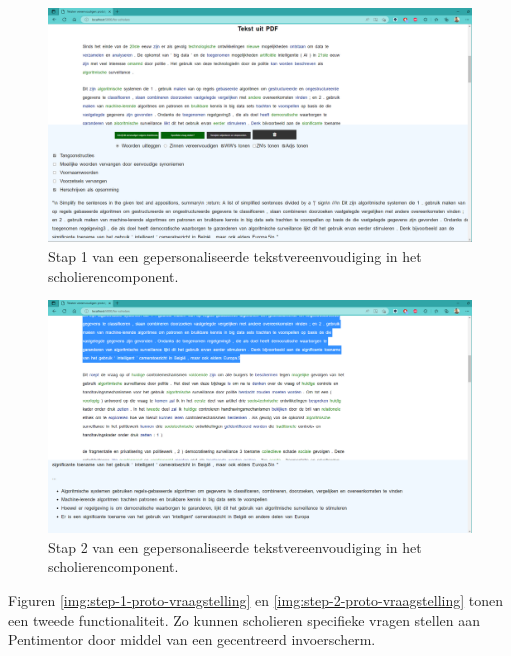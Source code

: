 \begin{center}
	\begin{figure}[H]
		\includegraphics[width=\linewidth]{img/proto-opsomming-1.png}
		\caption{Stap 1 van een gepersonaliseerde tekstvereenvoudiging in het scholierencomponent.}
		\label{img:proto-scholieren-step-1}
	\end{figure}
\end{center}

\begin{center}
	\begin{figure}[H]
		\includegraphics[width=\linewidth]{img/proto-opsomming-3.png}
		\caption{Stap 2 van een gepersonaliseerde tekstvereenvoudiging in het scholierencomponent.}
		\label{img:proto-scholieren-step-3}
	\end{figure}
\end{center}

Figuren \ref{img:step-1-proto-vraagstelling} en \ref{img:step-2-proto-vraagstelling} tonen een tweede functionaliteit. Zo kunnen scholieren specifieke vragen stellen aan Pentimentor door middel van een gecentreerd invoerscherm.

